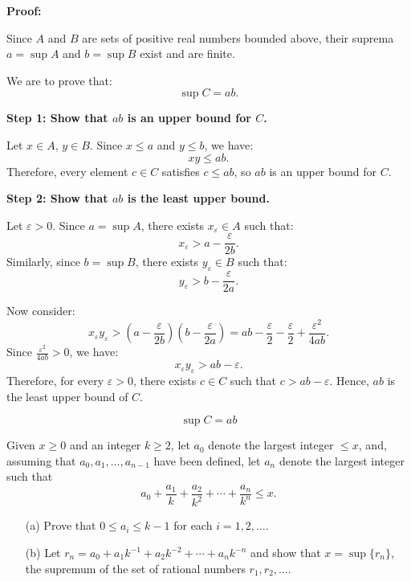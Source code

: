 \textbf{Proof:}

Since \( A \) and \( B \) are sets of positive real numbers bounded above, their suprema \( a = \sup A \) and \( b = \sup B \) exist and are finite.

We are to prove that:
\[
\sup C = ab.
\]

\textbf{Step 1: Show that \( ab \) is an upper bound for \( C \).}

Let \( x \in A \), \( y \in B \). Since \( x \leq a \) and \( y \leq b \), we have:
\[
xy \leq ab.
\]
Therefore, every element \( c \in C \) satisfies \( c \leq ab \), so \( ab \) is an upper bound for \( C \).

\textbf{Step 2: Show that \( ab \) is the least upper bound.}

Let \( \varepsilon > 0 \). Since \( a = \sup A \), there exists \( x_\varepsilon \in A \) such that:
\[
x_\varepsilon > a - \frac{\varepsilon}{2b}.
\]
Similarly, since \( b = \sup B \), there exists \( y_\varepsilon \in B \) such that:
\[
y_\varepsilon > b - \frac{\varepsilon}{2a}.
\]

Now consider:
\[
x_\varepsilon y_\varepsilon > \left(a - \frac{\varepsilon}{2b}\right)\left(b - \frac{\varepsilon}{2a}\right) = ab - \frac{\varepsilon}{2} - \frac{\varepsilon}{2} + \frac{\varepsilon^2}{4ab}.
\]
Since \( \frac{\varepsilon^2}{4ab} > 0 \), we have:
\[
x_\varepsilon y_\varepsilon > ab - \varepsilon.
\]
Therefore, for every \( \varepsilon > 0 \), there exists \( c \in C \) such that \( c > ab - \varepsilon \). Hence, \( ab \) is the least upper bound of \( C \).

\[
\boxed{\sup C = ab}
\]

\begin{problembox}
Given \( x \geq 0 \) and an integer \( k \geq 2 \), let \( a_0 \) denote the largest integer \( \leq x \), and, assuming that \( a_0, a_1, \dots, a_{n-1} \) have been defined, let \( a_n \) denote the largest integer such that
\[
a_0 + \frac{a_1}{k} + \frac{a_2}{k^2} + \cdots + \frac{a_n}{k^n} \leq x.
\]

\begin{enumerate}
\item[(a)] Prove that \( 0 \leq a_i \leq k - 1 \) for each \( i = 1, 2, \dots \).
\item[(b)] Let \( r_n = a_0 + a_1 k^{-1} + a_2 k^{-2} + \cdots + a_n k^{-n} \) and show that \( x = \sup \{ r_n \} \), the supremum of the set of rational numbers \( r_1, r_2, \dots \).
\end{enumerate}
\end{problembox}

